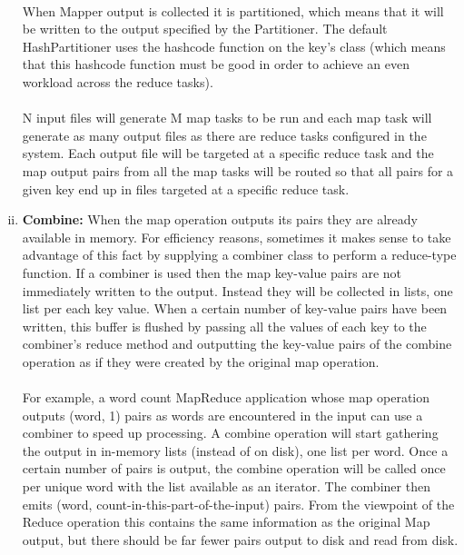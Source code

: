 \documentclass[a4paper,12pt,oneside]{report}
\begin{document}
\begin{enumerate}[(i)]
                \\
                When Mapper output is collected it is partitioned, which means that it will be written to the output 
                specified by the Partitioner. The default HashPartitioner uses the hashcode function on the key's class 
                (which means that this hashcode function must be good in order to achieve an even workload across the reduce tasks).\\ 
                \\
                N input files will generate M map tasks to be run and each map task will generate as many output files 
                as there are reduce tasks configured in the system. Each output file will be targeted at a specific reduce 
                task and the map output pairs from all the map tasks will be routed so that all pairs for a given key end up in 
                files targeted at a specific reduce task.

        \item \textbf{Combine:} When the map operation outputs its pairs they are already available in memory. For efficiency 
            reasons, sometimes it makes sense to take advantage of this fact by supplying a combiner class to perform 
            a reduce-type function. If a combiner is used then the map key-value pairs are not immediately written 
            to the output. Instead they will be collected in lists, one list per each key value. When a certain 
            number of key-value pairs have been written, this buffer is flushed by passing all the values of each 
            key to the combiner's reduce method and outputting the key-value pairs of the combine operation as if 
            they were created by the original map operation.\\ 
                \\
                For example, a word count MapReduce application whose map operation outputs (word, 1) pairs as words 
                are encountered in the input can use a combiner to speed up processing. A combine operation will start 
                gathering the output in in-memory lists (instead of on disk), one list per word. Once a certain number 
                of pairs is output, the combine operation will be called once per unique word with the list available 
                as an iterator. The combiner then emits (word, count-in-this-part-of-the-input) pairs. From the viewpoint 
                of the Reduce operation this contains the same information as the original Map output, but there should 
                be far fewer pairs output to disk and read from disk. 


\end{enumerate}
\end{document}
